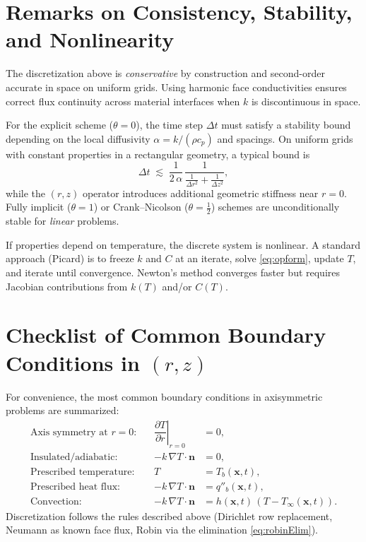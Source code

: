 \documentclass[11pt]{article}
\begin{document}
\section{Remarks on Consistency, Stability, and Nonlinearity}

The discretization above is \emph{conservative} by construction and second-order accurate in space on uniform grids. Using harmonic face conductivities ensures correct flux continuity across material interfaces when $k$ is discontinuous in space.

For the explicit scheme ($\theta=0$), the time step $\Delta t$ must satisfy a stability bound depending on the local diffusivity $\alpha=k/(\rho c_p)$ and spacings. On uniform grids with constant properties in a rectangular geometry, a typical bound is
\begin{equation}
\Delta t \;\lesssim\; \frac{1}{2\,\alpha}\,\frac{1}{\tfrac{1}{\Delta r^2}+\tfrac{1}{\Delta z^2}},
\end{equation}
while the $(r,z)$ operator introduces additional geometric stiffness near $r=0$. Fully implicit ($\theta=1$) or Crank--Nicolson ($\theta=\tfrac{1}{2}$) schemes are unconditionally stable for \emph{linear} problems.

If properties depend on temperature, the discrete system is nonlinear. A standard approach (Picard) is to freeze $k$ and $C$ at an iterate, solve \eqref{eq:opform}, update $T$, and iterate until convergence. Newton's method converges faster but requires Jacobian contributions from $k(T)$ and/or $C(T)$.

\section{Checklist of Common Boundary Conditions in $(r,z)$}

For convenience, the most common boundary conditions in axisymmetric problems are summarized:
\begin{align}
\text{Axis symmetry at }r=0:&& \left.\dfrac{\partial T}{\partial r}\right|_{r=0} &= 0,\\
\text{Insulated/adiabatic:}&& -k\,\nabla T\cdot\mathbf{n} &= 0,\\
\text{Prescribed temperature:}&& T &= T_b(\mathbf{x},t),\\
\text{Prescribed heat flux:}&& -k\,\nabla T\cdot\mathbf{n} &= q''_b(\mathbf{x},t),\\
\text{Convection:}&& -k\,\nabla T\cdot\mathbf{n} &= h(\mathbf{x},t)\,(T-T_\infty(\mathbf{x},t)).
\end{align}
Discretization follows the rules described above (Dirichlet row replacement, Neumann as known face flux, Robin via the elimination \eqref{eq:robinElim}).
\end{document}
